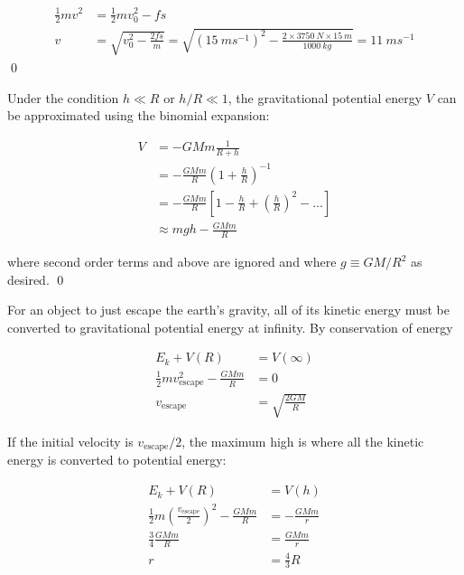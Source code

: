 \documentclass[12pt]{article}
\begin{document}
\begin{equation}
\begin{split}
    \frac{1}{2} m v^{2} &= \frac{1}{2} m v_{0}^{2} - f s \\
    v &= \sqrt{v_{0}^{2} - \frac{2fs}{m}} = \sqrt{(\qty{15}{ms^{-1}})^{2} - \frac{2 \times \qty{3750}{N} \times \qty{15}{m}}{\qty{1000}{kg}}} = \boxed{\qty{11}{ms^{-1}}}
\end{split}
\end{equation}
\qed


Under the condition $h \ll R$ or $h/R \ll 1$, the gravitational potential energy $V$ can be approximated using the binomial expansion:

\begin{equation}
\begin{split}
    V &= -GMm \frac{1}{R + h} \\
      &= -\frac{GMm}{R} \left( 1 + \frac{h}{R} \right)^{-1} \\
      &= -\frac{GMm}{R} \left[ 1 - \frac{h}{R} + \left( \frac{h}{R} \right)^{2} - \dots \right] \\
      &\approx mgh - \frac{GMm}{R}
\end{split}
\end{equation}

where second order terms and above are ignored and where $g \equiv GM/R^{2}$ as desired.
\qed


For an object to just escape the earth's gravity, all of its kinetic energy must be converted to gravitational potential energy at infinity. By conservation of energy

\begin{equation}
\begin{split}
    E_{k} + V(R) &= V(\infty) \\
    \frac{1}{2} m v_{\text{escape}}^{2} - \frac{GMm}{R} &= 0 \\
    v_{\text{escape}} &= \sqrt{\frac{2GM}{R}}
\end{split}
\end{equation}

If the initial velocity is $v_{\text{escape}}/2$, the maximum high is where all the kinetic energy is converted to potential energy:

\begin{equation}
\begin{split}
    E_{k} + V(R) &= V(h) \\
    \frac{1}{2} m \left( \frac{v_{\text{escape}}}{2} \right)^{2} - \frac{GMm}{R} &= -\frac{GMm}{r} \\
    \frac{3}{4} \frac{GMm}{R} &= \frac{GMm}{r} \\
    r &= \frac{4}{3} R
\end{split}
\end{equation}
\end{document}
